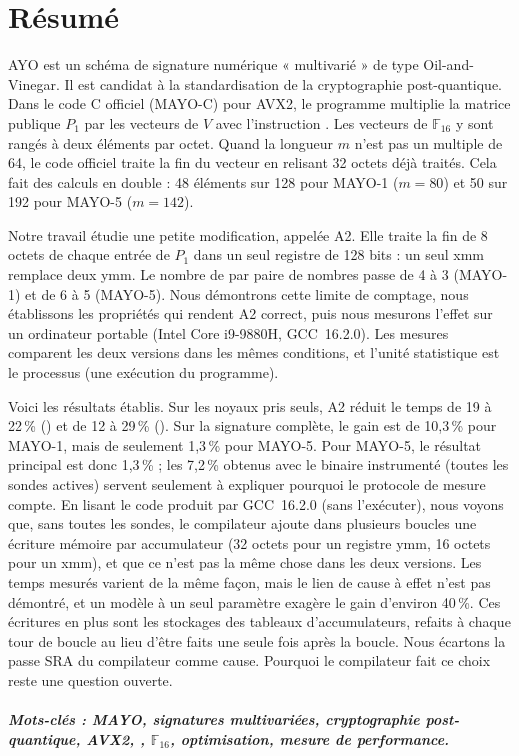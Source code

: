 \chapter*{Résumé}
\label{chap:resume}
AYO est un schéma de signature numérique « multivarié » de type Oil-and-Vinegar. Il est candidat à la standardisation de la cryptographie post-quantique. Dans le code C officiel (MAYO-C) pour AVX2, le programme multiplie la matrice publique $P_1$ par les vecteurs de $V$ avec l'instruction . Les vecteurs de $\mathbb{F}_{16}$ y sont rangés à deux éléments par octet. Quand la longueur $m$ n'est pas un multiple de 64, le code officiel traite la fin du vecteur en relisant 32 octets déjà traités. Cela fait des calculs en double : 48 éléments sur 128 pour MAYO-1 ($m=80$) et 50 sur 192 pour MAYO-5 ($m=142$).

Notre travail étudie une petite modification, appelée A2. Elle traite la fin de 8 octets de chaque entrée de $P_1$ dans un seul registre de 128 bits : un seul  xmm remplace deux  ymm. Le nombre de  par paire de nombres passe de 4 à 3 (MAYO-1) et de 6 à 5 (MAYO-5). Nous démontrons cette limite de comptage, nous établissons les propriétés qui rendent A2 correct, puis nous mesurons l'effet sur un ordinateur portable (Intel Core i9-9880H, GCC~16.2.0). Les mesures comparent les deux versions dans les mêmes conditions, et l'unité statistique est le processus (une exécution du programme).

Voici les résultats établis. Sur les noyaux pris seuls, A2 réduit le temps de 19 à 22\,\% () et de 12 à 29\,\% (). Sur la signature complète, le gain est de 10,3\,\% pour MAYO-1, mais de seulement 1,3\,\% pour MAYO-5. Pour MAYO-5, le résultat principal est donc 1,3\,\% ; les 7,2\,\% obtenus avec le binaire instrumenté (toutes les sondes actives) servent seulement à expliquer pourquoi le protocole de mesure compte. En lisant le code produit par GCC~16.2.0 (sans l'exécuter), nous voyons que, sans toutes les sondes, le compilateur ajoute dans plusieurs boucles une écriture mémoire par accumulateur (32 octets pour un registre ymm, 16 octets pour un xmm), et que ce n'est pas la même chose dans les deux versions. Les temps mesurés varient de la même façon, mais le lien de cause à effet n'est pas démontré, et un modèle à un seul paramètre exagère le gain d'environ 40\,\%. Ces écritures en plus sont les stockages des tableaux d'accumulateurs, refaits à chaque tour de boucle au lieu d'être faits une seule fois après la boucle. Nous écartons la passe SRA du compilateur comme cause. Pourquoi le compilateur fait ce choix reste une question ouverte.

\paragraph{Mots-clés : MAYO, signatures multivariées, cryptographie post-quantique, AVX2, , $\mathbb{F}_{16}$, optimisation, mesure de performance.}
\clearpage

